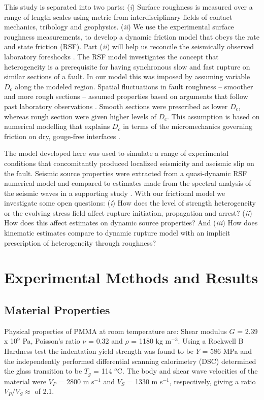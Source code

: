 \documentclass[draft]{agujournal2019}
\begin{document}
This study is separated into two parts: (\textit{i}) Surface roughness is measured over a range of length scales using metric from interdisciplinary fields of contact mechanics, tribology and geophysics. (\textit{ii}) We use the experimental surface roughness measurements, to develop a dynamic friction model that obeys the rate and state friction (RSF). Part (\textit{ii}) will help us reconcile the seismically observed laboratory foreshocks \cite{Selvadurai2019}. The RSF model investigates the concept that heterogeneity is a prerequisite for having synchronous slow and fast rupture on similar sections of a fault. In our model this was imposed by assuming variable $D_{c}$ along the modeled region. Spatial fluctuations in fault roughness -- smoother and more rough sections -- assumed properties based on arguments that follow past laboratory observations \cite{Marone1994, Marone1998}. Smooth sections were prescribed as lower $D_{c}$, whereas rough section were given higher levels of $D_{c}$. This assumption is based on numerical modelling that explains $D_{c}$ in terms of the micromechanics governing friction on dry, gouge-free interfaces \cite{Yoshioka1996}. 

The model developed here was used to simulate a range of experimental conditions that concomitantly produced localized seismicity and aseismic slip on the fault. Seismic source properties were extracted from a quasi-dynamic RSF numerical model and compared to estimates made from the spectral analysis of the seismic waves in a supporting study \cite{Selvadurai2019}. With our frictional model we investigate some open questions: (\textit{i}) How does the level of strength heterogeneity or the evolving stress field affect rupture initiation, propagation and arrest? (\textit{ii}) How does this affect estimates on dynamic source properties? And (\textit{iii}) How does kinematic estimates compare to dynamic rupture model with an implicit prescription of heterogeneity through roughness?

\section{Experimental Methods and Results}
\subsection{Material Properties}
\label{MaterialProperties}
Physical properties of PMMA at room temperature are:  Shear modulus $G$ = 2.39 x 10$^9$ Pa, Poisson's ratio $\nu$ = 0.32 and $\rho$ = 1180 kg m$^{-3}$.  Using a Rockwell B Hardness test the indentation yield strength was found to be $Y$ = 586 MPa and the independently performed differential scanning calorimetry (DSC) determined the glass transition to be $T_g$ = 114 $^o$C. The body and shear wave velocities of the material were $V_{P}$ = 2800 m s$^{-1}$ and $V_{S}$ = 1330  m s$^{-1}$, respectively, giving a ratio $V_{P}/V_{S} \approx$ of 2.1. 
\end{document}
